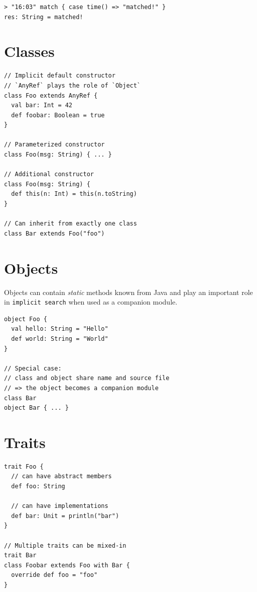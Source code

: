 \documentclass[10pt,landscape,a4paper]{article}
\begin{document}
\begin{multicols*}{4}
\begin{verbatim}
> "16:03" match { case time() => "matched!" }
res: String = matched!
\end{verbatim}

  \section{Classes}

\begin{verbatim}
// Implicit default constructor
// `AnyRef` plays the role of `Object`
class Foo extends AnyRef {
  val bar: Int = 42
  def foobar: Boolean = true
}

// Parameterized constructor
class Foo(msg: String) { ... }

// Additional constructor
class Foo(msg: String) {
  def this(n: Int) = this(n.toString)
}

// Can inherit from exactly one class
class Bar extends Foo("foo")
\end{verbatim}

  \section{Objects}

  \begin{mdframed}
    Objects can contain \textit{static} methods known from Java and
    play an important role in \texttt{implicit search} when used as a
    companion module.
  \end{mdframed}

\begin{verbatim}
object Foo {
  val hello: String = "Hello"
  def world: String = "World"
}

// Special case:
// class and object share name and source file
// => the object becomes a companion module
class Bar
object Bar { ... }
\end{verbatim}

  \section{Traits}

\begin{verbatim}
trait Foo {
  // can have abstract members
  def foo: String

  // can have implementations
  def bar: Unit = println("bar")
}

// Multiple traits can be mixed-in
trait Bar
class Foobar extends Foo with Bar {
  override def foo = "foo"
}
\end{verbatim}


\end{multicols*}
\end{document}
